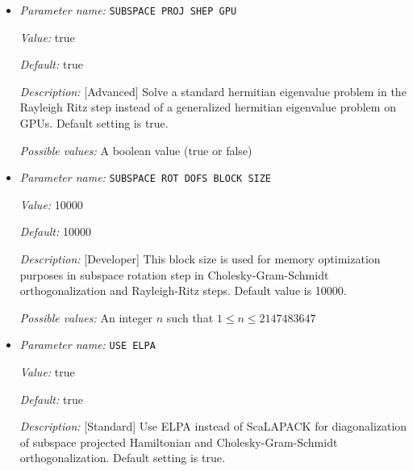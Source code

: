 \begin{itemize}
{\it Default:} 0


{\it Description:} [Advanced] SCF iteration no beyond which spectrum splitting based can be used.


{\it Possible values:} An integer $n$ such that $0\leq n \leq 2147483647$
\item {\it Parameter name:} {\tt SUBSPACE PROJ SHEP GPU}
\label{parameters:SCF parameters/Eigen_2dsolver parameters/SUBSPACE PROJ SHEP GPU}
\label{parameters:SCF_20parameters/Eigen_2dsolver_20parameters/SUBSPACE_20PROJ_20SHEP_20GPU}


{\it Value:} true


{\it Default:} true


{\it Description:} [Advanced] Solve a standard hermitian eigenvalue problem in the Rayleigh Ritz step instead of a generalized hermitian eigenvalue problem on GPUs. Default setting is true.


{\it Possible values:} A boolean value (true or false)
\item {\it Parameter name:} {\tt SUBSPACE ROT DOFS BLOCK SIZE}
\label{parameters:SCF parameters/Eigen_2dsolver parameters/SUBSPACE ROT DOFS BLOCK SIZE}
\label{parameters:SCF_20parameters/Eigen_2dsolver_20parameters/SUBSPACE_20ROT_20DOFS_20BLOCK_20SIZE}


{\it Value:} 10000


{\it Default:} 10000


{\it Description:} [Developer] This block size is used for memory optimization purposes in subspace rotation step in Cholesky-Gram-Schmidt orthogonalization and Rayleigh-Ritz steps. Default value is 10000.


{\it Possible values:} An integer $n$ such that $1\leq n \leq 2147483647$
\item {\it Parameter name:} {\tt USE ELPA}
\label{parameters:SCF parameters/Eigen_2dsolver parameters/USE ELPA}
\label{parameters:SCF_20parameters/Eigen_2dsolver_20parameters/USE_20ELPA}


{\it Value:} true


{\it Default:} true


{\it Description:} [Standard] Use ELPA instead of ScaLAPACK for diagonalization of subspace projected Hamiltonian and Cholesky-Gram-Schmidt orthogonalization.  Default setting is true.



\end{itemize}
